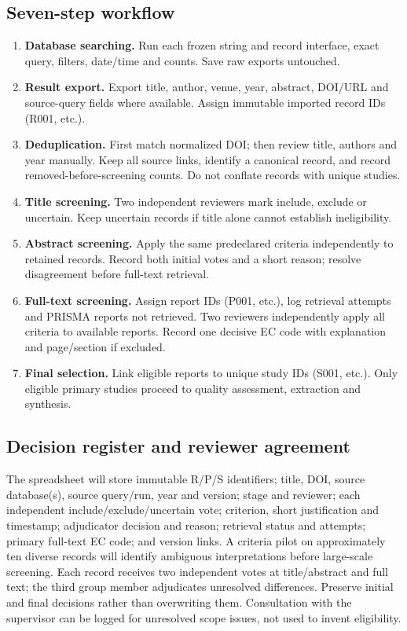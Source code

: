 \documentclass[12pt,a4paper]{article}
\begin{document}
\subsection{Seven-step workflow}
\begin{enumerate}[label=\textbf{Step \arabic*:},leftmargin=*]
\item \textbf{Database searching.} Run each frozen string and record interface, exact query, filters, date/time and counts. Save raw exports untouched.
\item \textbf{Result export.} Export title, author, venue, year, abstract, DOI/URL and source-query fields where available. Assign immutable imported record IDs (R001, etc.).
\item \textbf{Deduplication.} First match normalized DOI; then review title, authors and year manually. Keep all source links, identify a canonical record, and record removed-before-screening counts. Do not conflate records with unique studies.
\item \textbf{Title screening.} Two independent reviewers mark include, exclude or uncertain. Keep uncertain records if title alone cannot establish ineligibility.
\item \textbf{Abstract screening.} Apply the same predeclared criteria independently to retained records. Record both initial votes and a short reason; resolve disagreement before full-text retrieval.
\item \textbf{Full-text screening.} Assign report IDs (P001, etc.), log retrieval attempts and PRISMA reports not retrieved. Two reviewers independently apply all criteria to available reports. Record one decisive EC code with explanation and page/section if excluded.
\item \textbf{Final selection.} Link eligible reports to unique study IDs (S001, etc.). Only eligible primary studies proceed to quality assessment, extraction and synthesis.
\end{enumerate}

\subsection{Decision register and reviewer agreement}
The spreadsheet will store immutable R/P/S identifiers; title, DOI, source database(s), source query/run, year and version; stage and reviewer; each independent include/exclude/uncertain vote; criterion, short justification and timestamp; adjudicator decision and reason; retrieval status and attempts; primary full-text EC code; and version links. A criteria pilot on approximately ten diverse records will identify ambiguous interpretations before large-scale screening. Each record receives two independent votes at title/abstract and full text; the third group member adjudicates unresolved differences. Preserve initial and final decisions rather than overwriting them. Consultation with the supervisor can be logged for unresolved scope issues, not used to invent eligibility.
\end{document}
